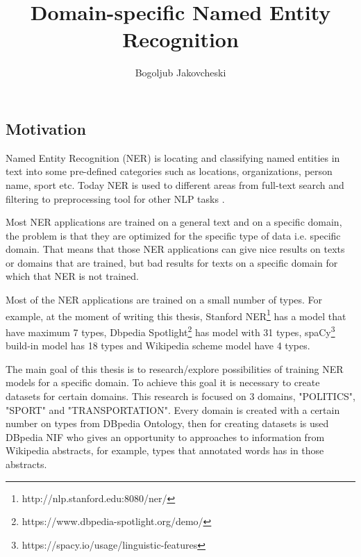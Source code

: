 \documentclass[thesis=M,english]{FITthesis}[2018/05/30]
\title{Domain-specific Named Entity Recognition}
\author{Bogoljub Jakovcheski} %
\begin{document}

\begin{introduction}

\section{Motivation}
    Named Entity Recognition (NER)\cite{wiki:NER} is locating and classifying named entities in text into some pre-defined categories such as locations, organizations, person name, sport etc. Today NER is used to different areas from full-text search and filtering to preprocessing tool for other NLP tasks \cite{master:NER}.  	
		
    Most NER applications are trained on a general text and on a specific domain, the problem is that they are optimized for the specific type of data i.e. specific domain. That means that those NER applications can give nice results on texts or domains that are trained, but bad results for texts on a specific domain for which that NER is not trained.
	  
    Most of the NER applications are trained on a small number of types. For example, at the moment of writing this thesis, Stanford NER\footnote{http://nlp.stanford.edu:8080/ner/} has a model that have maximum 7 types, Dbpedia Spotlight\footnote{https://www.dbpedia-spotlight.org/demo/} has model with 31 types, spaCy\footnote{https://spacy.io/usage/linguistic-features} build-in model has 18 types and Wikipedia scheme model have 4 types.
	  
	The main goal of this thesis is to research/explore possibilities of training NER models for a specific domain. To achieve this goal it is necessary to create datasets for certain domains. This research is focused on 3 domains, "POLITICS", "SPORT" and "TRANSPORTATION". Every domain is created with a certain number on types from DBpedia Ontology, then for creating datasets is used DBpedia NIF who gives an opportunity to approaches to information from Wikipedia abstracts, for example, types that annotated words has in those abstracts.
	  

\end{introduction}
\end{document}
